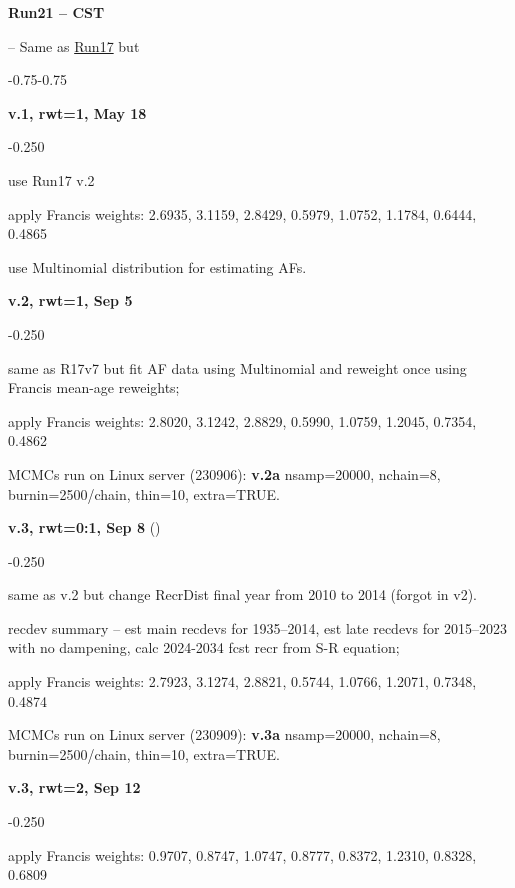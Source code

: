 \hypertarget{R21}{\textbf{Run21 -- CST}} -- Same as \hyperlink{R17}{Run17} but
\begin{itemize_csas}{-0.75}{-0.75}
	\item \textbf{v.1, rwt=1, May 18}
	\begin{itemize_csas}{-0.25}{0}
		\item use Run17 v.2
		\item apply Francis weights: 2.6935, 3.1159, 2.8429, 0.5979, 1.0752, 1.1784, 0.6444, 0.4865
		\item use Multinomial distribution for estimating AFs.
	\end{itemize_csas}
	\item \textbf{v.2, rwt=1, Sep 5}
	\begin{itemize_csas}{-0.25}{0}
		\item same as R17v7 but fit AF data using Multinomial and reweight once using Francis mean-age reweights;
		\item apply Francis weights: 2.8020, 3.1242, 2.8829, 0.5990, 1.0759, 1.2045, 0.7354, 0.4862
		\item MCMCs run on Linux server (230906): \textbf{v.2a} nsamp=20000, nchain=8, burnin=2500/chain, thin=10, extra=TRUE.
	\end{itemize_csas}
	\item \textbf{v.3, rwt=0:1, Sep 8} ()
	\begin{itemize_csas}{-0.25}{0}
		\item same as v.2 but change RecrDist final year from 2010 to 2014 (forgot in v2).
		\item recdev summary -- est main recdevs for 1935--2014, est late recdevs for 2015--2023 with no dampening, calc 2024-2034 fcst recr from S-R equation;
		\item apply Francis weights: 2.7923, 3.1274, 2.8821, 0.5744, 1.0766, 1.2071, 0.7348, 0.4874
		\item MCMCs run on Linux server (230909): \textbf{v.3a} nsamp=20000, nchain=8, burnin=2500/chain, thin=10, extra=TRUE.
	\end{itemize_csas}
	\item \textbf{v.3, rwt=2, Sep 12}
	\begin{itemize_csas}{-0.25}{0}
		\item apply Francis weights: 0.9707, 0.8747, 1.0747, 0.8777, 0.8372, 1.2310, 0.8328, 0.6809
		\item {}

\end{itemize_csas}
\end{itemize_csas}
